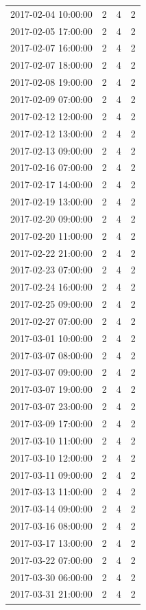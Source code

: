 \begin{tabular}{lrrr}
2017-02-04 10:00:00 & 2 & 4 & 2 \\
2017-02-05 17:00:00 & 2 & 4 & 2 \\
2017-02-07 16:00:00 & 2 & 4 & 2 \\
2017-02-07 18:00:00 & 2 & 4 & 2 \\
2017-02-08 19:00:00 & 2 & 4 & 2 \\
2017-02-09 07:00:00 & 2 & 4 & 2 \\
2017-02-12 12:00:00 & 2 & 4 & 2 \\
2017-02-12 13:00:00 & 2 & 4 & 2 \\
2017-02-13 09:00:00 & 2 & 4 & 2 \\
2017-02-16 07:00:00 & 2 & 4 & 2 \\
2017-02-17 14:00:00 & 2 & 4 & 2 \\
2017-02-19 13:00:00 & 2 & 4 & 2 \\
2017-02-20 09:00:00 & 2 & 4 & 2 \\
2017-02-20 11:00:00 & 2 & 4 & 2 \\
2017-02-22 21:00:00 & 2 & 4 & 2 \\
2017-02-23 07:00:00 & 2 & 4 & 2 \\
2017-02-24 16:00:00 & 2 & 4 & 2 \\
2017-02-25 09:00:00 & 2 & 4 & 2 \\
2017-02-27 07:00:00 & 2 & 4 & 2 \\
2017-03-01 10:00:00 & 2 & 4 & 2 \\
2017-03-07 08:00:00 & 2 & 4 & 2 \\
2017-03-07 09:00:00 & 2 & 4 & 2 \\
2017-03-07 19:00:00 & 2 & 4 & 2 \\
2017-03-07 23:00:00 & 2 & 4 & 2 \\
2017-03-09 17:00:00 & 2 & 4 & 2 \\
2017-03-10 11:00:00 & 2 & 4 & 2 \\
2017-03-10 12:00:00 & 2 & 4 & 2 \\
2017-03-11 09:00:00 & 2 & 4 & 2 \\
2017-03-13 11:00:00 & 2 & 4 & 2 \\
2017-03-14 09:00:00 & 2 & 4 & 2 \\
2017-03-16 08:00:00 & 2 & 4 & 2 \\
2017-03-17 13:00:00 & 2 & 4 & 2 \\
2017-03-22 07:00:00 & 2 & 4 & 2 \\
2017-03-30 06:00:00 & 2 & 4 & 2 \\
2017-03-31 21:00:00 & 2 & 4 & 2 \\

\end{tabular}
